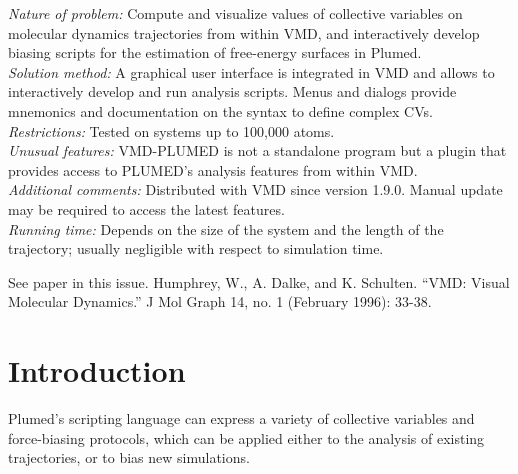 \documentclass[preprint,12pt]{elsarticle}
\begin{document}
\begin{small}
  {\em Nature of problem:} Compute and visualize values of collective
  variables on molecular dynamics trajectories from within VMD, and
  interactively develop biasing scripts for the estimation of
  free-energy surfaces in Plumed.
  \\
  {\em Solution method:} A graphical user interface is integrated in
  VMD and allows to interactively develop and run analysis scripts.
  Menus and dialogs provide mnemonics and documentation on the syntax
  to define complex CVs.
  \\
  {\em Restrictions:}
  Tested on systems up to 100,000 atoms. \\
  {\em Unusual features:} VMD-PLUMED is not a standalone program but a
  plugin that provides access to PLUMED's analysis features from within VMD. \\
  {\em Additional comments:} Distributed with VMD since version 1.9.0.
  Manual  update may be required  to access the latest features.   \\
  {\em Running time:} Depends on the size of the system and the length
  of the trajectory; usually negligible with respect to simulation time.  \\
\begin{thebibliography}{0}
See paper in this issue.
Humphrey, W., A. Dalke, and K. Schulten. ``VMD: Visual Molecular Dynamics.'' J Mol Graph 14, no. 1 (February 1996): 33-38. 
\end{thebibliography}

\end{small}



\section{Introduction}


 Plumed's scripting
  language can express a variety of collective variables and
  force-biasing protocols, which can be applied either to the analysis
  of existing trajectories, or to bias new simulations.
\end{document}
